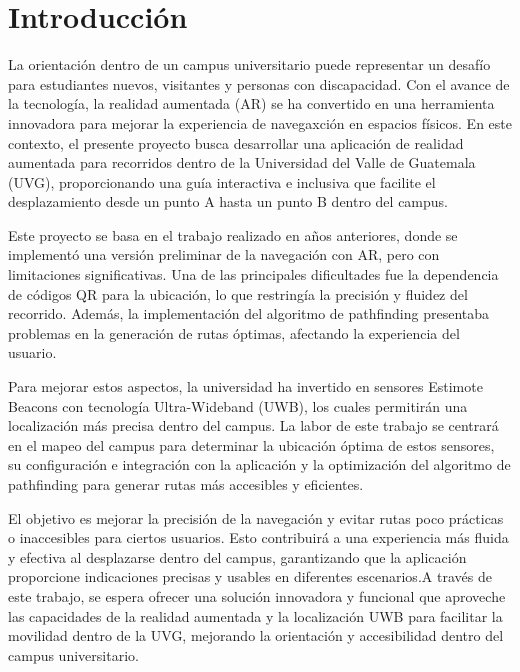 \clearpage
{}

\section{Introducción}
{\justify
La orientación dentro de un campus universitario puede representar un desafío para estudiantes nuevos, visitantes y personas con
 discapacidad. Con el avance de la tecnología, la realidad aumentada (AR) se ha convertido en una herramienta innovadora para mejorar
  la experiencia de navegaxción en espacios físicos. En este contexto, el presente proyecto busca desarrollar una aplicación de realidad
   aumentada para recorridos dentro de la Universidad del Valle de Guatemala (UVG), proporcionando una guía interactiva e inclusiva 
   que facilite el desplazamiento desde un punto A hasta un punto B dentro del campus.

Este proyecto se basa en el trabajo realizado en años anteriores, donde se implementó una versión preliminar de la navegación con AR,
 pero con limitaciones significativas. Una de las principales dificultades fue la dependencia de códigos QR para la ubicación, lo que
  restringía la precisión y fluidez del recorrido. Además, la implementación del algoritmo de pathfinding presentaba problemas en la 
  generación de rutas óptimas, afectando la experiencia del usuario.

Para mejorar estos aspectos, la universidad ha invertido en sensores Estimote Beacons con tecnología Ultra-Wideband (UWB), los cuales
 permitirán una localización más precisa dentro del campus. La labor de este trabajo se centrará en el mapeo del campus para 
 determinar la ubicación óptima de estos sensores, su configuración e integración con la aplicación y la optimización del algoritmo
  de pathfinding para generar rutas más accesibles y eficientes.

El objetivo es mejorar la precisión de la navegación y evitar rutas poco prácticas o inaccesibles para ciertos usuarios. Esto 
contribuirá a una experiencia más fluida y efectiva al desplazarse dentro del campus, garantizando que la aplicación proporcione 
indicaciones precisas y usables en diferentes escenarios.A través de este trabajo, se espera ofrecer una solución innovadora y 
funcional que aproveche las capacidades de la realidad aumentada y la localización UWB para facilitar la movilidad dentro de la UVG,
 mejorando la orientación y accesibilidad dentro del campus universitario.}
\newpage